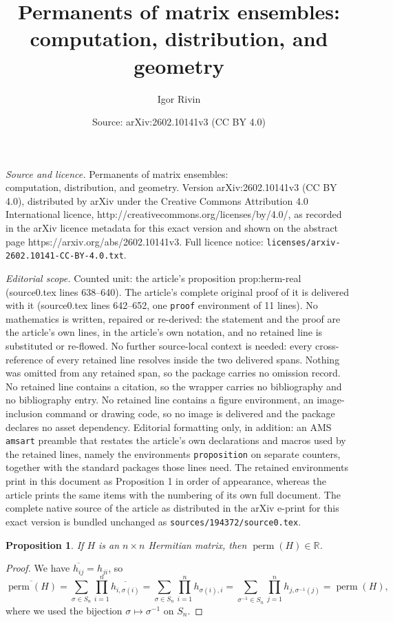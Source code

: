 \documentclass[10pt,a4paper]{amsart}
\title{Permanents of matrix ensembles:\\computation, distribution, and geometry}
\author{Igor Rivin}
\date{Source: arXiv:2602.10141v3 (CC BY 4.0)}
\newtheorem{proposition}{Proposition}
\DeclareMathOperator{\perm}{perm}
\begin{document}
\maketitle

\noindent\emph{Source and licence.} Permanents of matrix ensembles:\\computation, distribution, and geometry. Version arXiv:2602.10141v3 (CC BY 4.0), distributed by arXiv under the Creative Commons Attribution 4.0 International licence, http://creativecommons.org/licenses/by/4.0/, as recorded in the arXiv licence metadata for this exact version and shown on the abstract page https://arxiv.org/abs/2602.10141v3. Full licence notice: \texttt{licenses/arxiv-2602.10141-CC-BY-4.0.txt}.\par\smallskip

\noindent\textit{Editorial scope.} Counted unit: the article's proposition prop:herm-real (source0.tex lines 638--640). The article's complete original proof of it is delivered with it (source0.tex lines 642--652, one \texttt{proof} environment of 11 lines). No mathematics is written, repaired or re-derived: the statement and the proof are the article's own lines, in the article's own notation, and no retained line is substituted or re-flowed.  No further source-local context is needed: every cross-reference of every retained line resolves inside the two delivered spans.  Nothing was omitted from any retained span, so the package carries no omission record.  No retained line contains a citation, so the wrapper carries no bibliography and no bibliography entry.  No retained line contains a figure environment, an image-inclusion command or drawing code, so no image is delivered and the package declares no asset dependency.  Editorial formatting only, in addition: an AMS \texttt{amsart} preamble that restates the article's own declarations and macros used by the retained lines, namely the environments \texttt{proposition} on separate counters, together with the standard packages those lines need.  The retained environments print in this document as Proposition 1 in order of appearance, whereas the article prints the same items with the numbering of its own full document.  The complete native source of the article as distributed in the arXiv e-print for this exact version is bundled unchanged as \texttt{sources/194372/source0.tex}.
\begin{proposition}\label{prop:herm-real}
If $H$ is an $n\times n$ Hermitian matrix, then $\perm(H)\in\mathbb{R}$.
\end{proposition}

\begin{proof}
We have $\overline{h_{ij}}=h_{ji}$, so
\[
  \overline{\perm(H)}
  = \sum_{\sigma\in S_n}\prod_{i=1}^n \overline{h_{i,\sigma(i)}}
  = \sum_{\sigma\in S_n}\prod_{i=1}^n h_{\sigma(i),i}
  = \sum_{\sigma^{-1}\in S_n}\prod_{j=1}^n h_{j,\sigma^{-1}(j)}
  = \perm(H),
\]
where we used the bijection $\sigma\mapsto\sigma^{-1}$ on $S_n$.
\end{proof}
\end{document}
